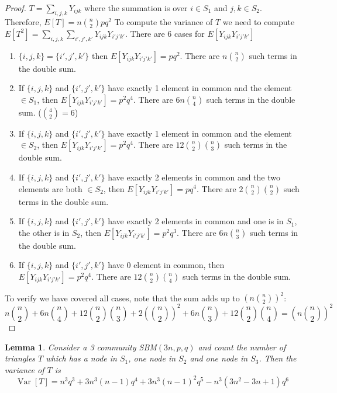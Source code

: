 \documentclass{ctexart}
\newtheorem{lemma}{Lemma}
\DeclareMathOperator{\Var}{Var}
\begin{document}
\begin{proof}
	$T=\sum_{i,j,k} Y_{ijk}$ where the summation is over $i \in S_1$ and $j,k \in S_2$. Therefore, $E[T] = n\binom{n}{2}pq^2$
	To compute the variance of $T$ we need to compute $E[T^2] = \sum_{i,j,k}\sum_{i',j',k'} Y_{ijk}Y_{i'j'k'}$.
	There are 6 cases for $E[Y_{ijk}Y_{i'j'k'}]$
	\begin{enumerate}
		\item $\{i,j,k\} = \{i',j',k'\}$ then $E[Y_{ijk}Y_{i'j'k'}] = pq^2$.
		There are $n\binom{n}{2}$ such terms in the double sum.
		\item If $\{i,j,k\}$ and $\{i',j',k'\}$ have exactly 1 element in common and the element $\in S_1$, then $E[Y_{ijk}Y_{i'j'k'}] = p^2q^4$.
		There are $6n\binom{n}{4}$ such terms in the double sum. ($\binom{4}{2}=6$)
		\item If $\{i,j,k\}$ and $\{i',j',k'\}$ have exactly 1 element in common and the element $\in S_2$, then $E[Y_{ijk}Y_{i'j'k'}] = p^2q^4$.
		There are $12\binom{n}{2}\binom{n}{3}$ such terms in the double sum.
		\item If $\{i,j,k\}$ and $\{i',j',k'\}$ have exactly 2 elements in common and the two elements are both $\in S_2$, then $E[Y_{ijk}Y_{i'j'k'}] = pq^4$.
There are $2\binom{n}{2}\binom{n}{2}$ such terms in the double sum.
\item If $\{i,j,k\}$ and $\{i',j',k'\}$ have exactly 2 elements in common and one is in $S_1$, the other is in $S_2$, then $E[Y_{ijk}Y_{i'j'k'}] = p^2q^3$.
There are $6n\binom{n}{3}$ such terms in the double sum.
\item If $\{i,j,k\}$ and $\{i',j',k'\}$ have 0 element in common, then $E[Y_{ijk}Y_{i'j'k'}] = p^2q^4$.
There are $12\binom{n}{2}\binom{n}{4}$ such terms in the double sum.
	\end{enumerate}
To verify we have covered all cases, note that the sum adds up to $(n\binom{n}{2})^2$:
$$
n\binom{n}{2} + 6n\binom{n}{4} + 12\binom{n}{2} \binom{n}{3} + 2(\binom{n}{2})^2 + 6n\binom{n}{3} + 12\binom{n}{2}\binom{n}{4} = \left(n\binom{n}{2}\right)^2
$$
\end{proof}
\begin{lemma}\label{lem:SBM_tr_counting_3}
	Consider a 3 community SBM$(3n, p, q)$ and count the number of triangles $T$ which has a node in $S_1$, one node in $S_2$ and one node in $S_3$.
	Then the variance of $T$ is
	\begin{equation}\label{eq:SBM_tr_counting_three}
	\Var[T] = n^3 q^3  + 3n^3(n-1) q^4  + 3 n^3 (n-1)^2 q^5 - n^3(3n^2-3n+1)q^6
	\end{equation}
\end{lemma}
\end{document}
